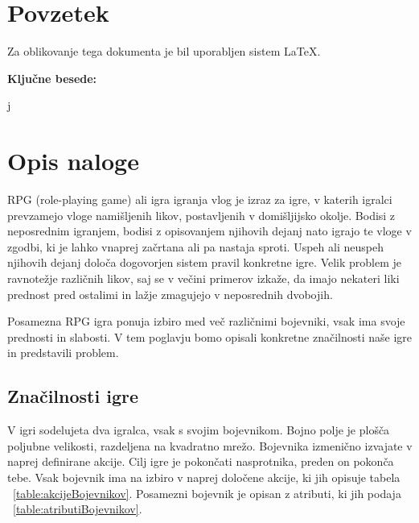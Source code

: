 \documentclass[12pt,a4paper,openany]{book}
\begin{document}
\chapter*{Povzetek}


Za oblikovanje tega dokumenta je bil uporabljen sistem \LaTeX.

\vspace{1.3cm}
\noindent
{\large \bf Ključne besede:}

\vspace{0.5cm}
\noindent
j




\chapter{Opis naloge}
RPG (role-playing game) ali igra igranja vlog je izraz za igre, v katerih igralci prevzamejo vloge namišljenih likov, postavljenih v domišljijsko okolje. Bodisi z neposrednim igranjem, bodisi z opisovanjem njihovih dejanj nato igrajo te vloge v zgodbi, ki je lahko vnaprej začrtana ali pa nastaja sproti. Uspeh ali neuspeh njihovih dejanj določa dogovorjen sistem pravil konkretne igre. Velik problem je ravnotežje različnih likov, saj se v večini primerov izkaže, da imajo nekateri liki prednost pred ostalimi in lažje zmagujejo v neposrednih dvobojih.

Posamezna RPG igra ponuja izbiro med več različnimi bojevniki, vsak ima svoje prednosti in slabosti. V tem poglavju bomo opisali konkretne značilnosti naše igre in predstavili problem.

\section{Značilnosti igre}
V igri sodelujeta dva igralca, vsak s svojim bojevnikom. Bojno polje je plošča poljubne velikosti, razdeljena na kvadratno mrežo. Bojevnika izmenično izvajate v naprej definirane akcije. Cilj igre je pokončati nasprotnika, preden on pokonča tebe. Vsak bojevnik ima na izbiro v naprej določene akcije, ki jih opisuje tabela ~\ref{table:akcijeBojevnikov}. Posamezni bojevnik je opisan z atributi, ki jih podaja ~\ref{table:atributiBojevnikov}.
\end{document}
